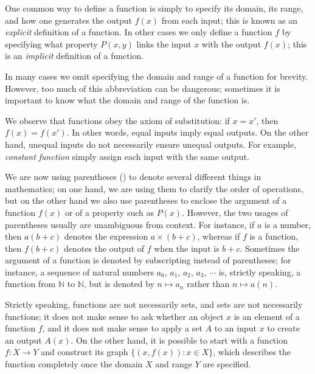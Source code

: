 \begin{note}
One common way to define a function is simply to specify its domain, its range, and how one generates the output \(f(x)\) from each input;
this is known as an \emph{explicit} definition of a function.
In other cases we only define a function \(f\) by specifying what property \(P(x, y)\) links the input \(x\) with the output \(f(x)\);
this is an \emph{implicit} definition of a function.
\end{note}

\begin{note}
In many cases we omit specifying the domain and range of a function for brevity.
However, too much of this abbreviation can be dangerous;
sometimes it is important to know what the domain and range of the function is.
\end{note}

\begin{note}
We observe that functions obey the axiom of substitution: if \(x = x'\), then \(f(x) = f(x')\).
In other words, equal inputs imply equal outputs.
On the other hand, unequal inputs do not necessarily ensure unequal outputs.
For example, \emph{constant function} simply assign each input with the same output.
\end{note}

\setcounter{theorem}{4}
\begin{remark}\label{3.3.5}
We are now using parentheses () to denote several different things in mathematics;
on one hand, we are using them to clarify the order of operations, but on the other hand we also use parentheses to enclose the argument of a function \(f(x)\) or of a property such as \(P(x)\).
However, the two usages of parentheses usually are unambiguous from context.
For instance, if \(a\) is a number, then \(a(b + c)\) denotes the expression \(a \times (b + c)\), whereas if \(f\) is a function, then \(f(b + c)\) denotes the output of \(f\) when the input is \(b + c\).
Sometimes the argument of a function is denoted by subscripting instead of parentheses;
for instance, a sequence of natural numbers \(a_0\), \(a_1\), \(a_2\), \(a_3\), \(\cdots\) is, strictly speaking, a function from \(\mathds{N}\) to \(\mathds{N}\), but is denoted by \(n \mapsto a_n\) rather than \(n \mapsto a(n)\).
\end{remark}

\begin{remark}\label{3.3.6}
Strictly speaking, functions are not necessarily sets, and sets are not necessarily functions;
it does not make sense to ask whether an object \(x\) is an element of a function \(f\), and it does not make sense to apply a set \(A\) to an input \(x\) to create an output \(A(x)\).
On the other hand, it is possible to start with a function \(f : X \to Y\) and construct its graph \(\{(x, f(x)) : x \in X\}\), which describes the function completely once the domain \(X\) and range \(Y\) are specified.
\end{remark}

